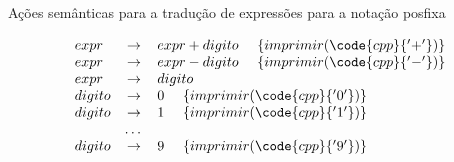 \begin{frame}[fragile]{Ações semânticas para a tradução de expressões para a notação posfixa}

\[
    \begin{array}{lcl}
        expr & \to & expr + digito\ \ \ \ \{ imprimir(\code{cpp}{'+'}) \} \\
        expr & \to & expr - digito\ \ \ \ \{ imprimir(\code{cpp}{'-'})\} \\
        expr & \to & digito \\
        digito & \to & 0 \ \ \ \ \{ imprimir(\code{cpp}{'0'}) \} \\
        digito & \to & 1 \ \ \ \ \{ imprimir(\code{cpp}{'1'}) \} \\
        & $\ldots$ \\
        digito & \to & 9 \ \ \ \ \{ imprimir(\code{cpp}{'9'}) \} \\
    \end{array}
\]

\end{frame}

